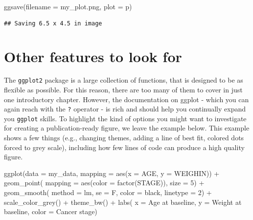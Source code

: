 \documentclass[
]{book}
\newenvironment{Shaded}{\begin{snugshade}}{\end{snugshade}}
\newcommand{\AttributeTok}[1]{\textcolor[rgb]{0.77,0.63,0.00}{#1}}
\newcommand{\DecValTok}[1]{\textcolor[rgb]{0.00,0.00,0.81}{#1}}
\newcommand{\FunctionTok}[1]{\textcolor[rgb]{0.00,0.00,0.00}{#1}}
\newcommand{\NormalTok}[1]{#1}
\newcommand{\SpecialCharTok}[1]{\textcolor[rgb]{0.00,0.00,0.00}{#1}}
\newcommand{\StringTok}[1]{\textcolor[rgb]{0.31,0.60,0.02}{#1}}
\begin{document}
\begin{Shaded}
\begin{Highlighting}[]
\FunctionTok{ggsave}\NormalTok{(}\AttributeTok{filename =} \StringTok{\textquotesingle{}my\_plot.png\textquotesingle{}}\NormalTok{, }\AttributeTok{plot =}\NormalTok{ p)}
\end{Highlighting}
\end{Shaded}

\begin{verbatim}
## Saving 6.5 x 4.5 in image
\end{verbatim}

\hypertarget{other-features-to-look-for}{%
\section{Other features to look for}\label{other-features-to-look-for}}

The \texttt{ggplot2} package is a large collection of functions, that is designed to be as flexible as possible. For this reason, there are too many of them to cover in just one introductory chapter. However, the documentation on ggplot - which you can again reach with the \texttt{?} operator - is rich and should help you continually expand you \texttt{ggplot} skills. To highlight the kind of options you might want to investigate for creating a publication-ready figure, we leave the example below. This example shows a few things (e.g., changing themes, adding a line of best fit, colored dots forced to grey scale), including how few lines of code can produce a high quality figure.

\begin{Shaded}
\begin{Highlighting}[]
\FunctionTok{ggplot}\NormalTok{(}\AttributeTok{data =}\NormalTok{ my\_data, }\AttributeTok{mapping =} \FunctionTok{aes}\NormalTok{(}\AttributeTok{x =}\NormalTok{ AGE, }\AttributeTok{y =}\NormalTok{ WEIGHIN)) }\SpecialCharTok{+}
  \FunctionTok{geom\_point}\NormalTok{(}
    \AttributeTok{mapping =} \FunctionTok{aes}\NormalTok{(}\AttributeTok{color =} \FunctionTok{factor}\NormalTok{(STAGE)), }
    \AttributeTok{size =} \DecValTok{5}\NormalTok{) }\SpecialCharTok{+}
  \FunctionTok{geom\_smooth}\NormalTok{(}
    \AttributeTok{method =} \StringTok{\textquotesingle{}lm\textquotesingle{}}\NormalTok{, }
    \AttributeTok{se =}\NormalTok{ F, }
    \AttributeTok{color =} \StringTok{\textquotesingle{}black\textquotesingle{}}\NormalTok{, }
    \AttributeTok{linetype =} \DecValTok{2}\NormalTok{) }\SpecialCharTok{+}
  \FunctionTok{scale\_color\_grey}\NormalTok{() }\SpecialCharTok{+}
  \FunctionTok{theme\_bw}\NormalTok{() }\SpecialCharTok{+}
  \FunctionTok{labs}\NormalTok{(}
    \AttributeTok{x =} \StringTok{\textquotesingle{}Age at baseline\textquotesingle{}}\NormalTok{,}
    \AttributeTok{y =} \StringTok{\textquotesingle{}Weight at baseline\textquotesingle{}}\NormalTok{,}
    \AttributeTok{color =} \StringTok{\textquotesingle{}Cancer stage\textquotesingle{}}\NormalTok{)}
\end{Highlighting}
\end{Shaded}
\end{document}
